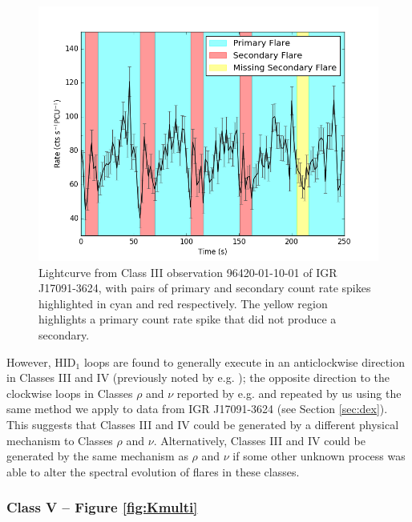 \begin{figure}
    \includegraphics[width=\columnwidth, trim = 0mm 0mm 0mm 0mm]{images/classIIIsecpeak.png}
    \captionsetup{singlelinecheck=off}
    \caption{Lightcurve from Class III observation 96420-01-10-01 of IGR J17091-3624, with pairs of primary and secondary count rate spikes highlighted in cyan and red respectively.  The yellow region highlights a primary count rate spike that did not produce a secondary.}
   \label{fig:III_IV_spike}
\end{figure}

\par However, HID$_1$ loops are found to generally execute in an anticlockwise direction in Classes III and IV (previously noted by e.g. \citealp{Altamirano_IGR_FH}); the opposite direction to the clockwise loops in Classes $\rho$ and $\nu$ reported by e.g. \citealp{Belloni_GRS_MI} and repeated by us using the same method we apply to data from IGR J17091-3624 (see Section \ref{sec:dex}).  This suggests that Classes III and IV could be generated by a different physical mechanism to Classes $\rho$ and $\nu$.  Alternatively, Classes III and IV could be generated by the same mechanism as $\rho$ and $\nu$ if some other unknown process was able to alter the spectral evolution of flares in these classes.

\subsubsection{Class V -- Figure \ref{fig:Kmulti}}

